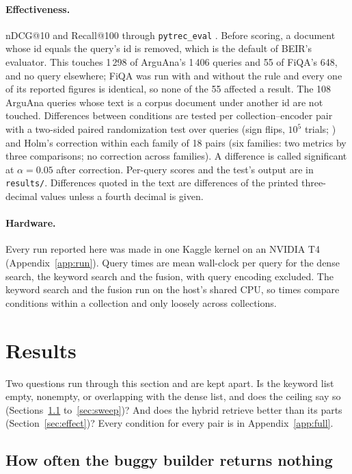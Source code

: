 \documentclass[11pt]{article}
\begin{document}
\paragraph{Effectiveness.} nDCG@10 and Recall@100 through \texttt{pytrec\_eval} \citep{vangysel2018pytrec}. Before scoring, a document whose id equals the query's id is removed, which is the default of BEIR's evaluator. This touches 1\,298 of ArguAna's 1\,406 queries and 55 of FiQA's 648, and no query elsewhere; FiQA was run with and without the rule and every one of its reported figures is identical, so none of the 55 affected a result. The 108 ArguAna queries whose text is a corpus document under another id are not touched. Differences between conditions are tested per collection--encoder pair with a two-sided paired randomization test over queries (sign flips, $10^5$ trials; \citealp{smucker2007comparison}) and Holm's correction within each family of 18 pairs (six families: two metrics by three comparisons; no correction across families). A difference is called significant at $\alpha = 0.05$ after correction. Per-query scores and the test's output are in \texttt{results/}. Differences quoted in the text are differences of the printed three-decimal values unless a fourth decimal is given.

\paragraph{Hardware.} Every run reported here was made in one Kaggle kernel on an NVIDIA T4 (Appendix~\ref{app:run}). Query times are mean wall-clock per query for the dense search, the keyword search and the fusion, with query encoding excluded. The keyword search and the fusion run on the host's shared CPU, so times compare conditions within a collection and only loosely across collections.

\section{Results}
\label{sec:results}

Two questions run through this section and are kept apart. Is the keyword list empty, nonempty, or overlapping with the dense list, and does the ceiling say so (Sections~\ref{sec:leg} to~\ref{sec:sweep})? And does the hybrid retrieve better than its parts (Section~\ref{sec:effect})? Every condition for every pair is in Appendix~\ref{app:full}.

\subsection{How often the buggy builder returns nothing}
\label{sec:leg}
\end{document}
